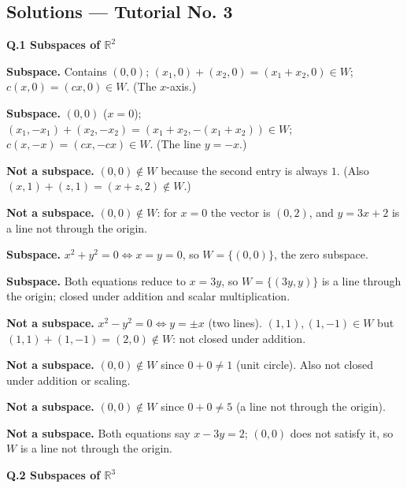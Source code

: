 \subsection*{Solutions --- Tutorial No. 3}
\medskip\noindent\textbf{Q.1  Subspaces of $\mathbb{R}^2$}\par\smallskip
\begin{description}[leftmargin=1.2cm,itemsep=2pt]
\item[1.] \textbf{Subspace.} Contains $(0,0)$; $(x_1,0)+(x_2,0)=(x_1+x_2,0)\in W$; $c(x,0)=(cx,0)\in W$. (The $x$-axis.)
\item[2.] \textbf{Subspace.} $(0,0)$ ($x=0$); $(x_1,-x_1)+(x_2,-x_2)=(x_1+x_2,-(x_1+x_2))\in W$; $c(x,-x)=(cx,-cx)\in W$. (The line $y=-x$.)
\item[3.] \textbf{Not a subspace.} $(0,0)\notin W$ because the second entry is always $1$. (Also $(x,1)+(z,1)=(x+z,2)\notin W$.)
\item[4.] \textbf{Not a subspace.} $(0,0)\notin W$: for $x=0$ the vector is $(0,2)$, and $y=3x+2$ is a line not through the origin.
\item[5.] \textbf{Subspace.} $x^2+y^2=0\iff x=y=0$, so $W=\{(0,0)\}$, the zero subspace.
\item[6.] \textbf{Subspace.} Both equations reduce to $x=3y$, so $W=\{(3y,y)\}$ is a line through the origin; closed under addition and scalar multiplication.
\item[7.] \textbf{Not a subspace.} $x^2-y^2=0\iff y=\pm x$ (two lines). $(1,1),(1,-1)\in W$ but $(1,1)+(1,-1)=(2,0)\notin W$: not closed under addition.
\item[8.] \textbf{Not a subspace.} $(0,0)\notin W$ since $0+0\ne1$ (unit circle). Also not closed under addition or scaling.
\item[9.] \textbf{Not a subspace.} $(0,0)\notin W$ since $0+0\neq5$ (a line not through the origin).
\item[10.] \textbf{Not a subspace.} Both equations say $x-3y=2$; $(0,0)$ does not satisfy it, so $W$ is a line not through the origin.
\end{description}
\medskip\noindent\textbf{Q.2  Subspaces of $\mathbb{R}^3$}\par\smallskip
